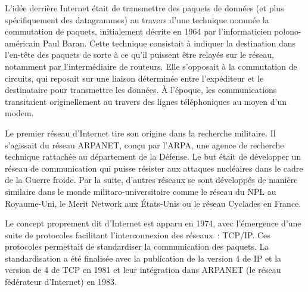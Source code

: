 
L'idée derrière Internet était de transmettre des paquets de données (et plus spécifiquement des datagrammes) au travers d'une technique nommée la commutation de paquets, initialement décrite en 1964 par l'informaticien polono-américain Paul Baran. Cette technique consistait à indiquer la destination dans l'en-tête des paquets de sorte à ce qu'il puissent être relayés sur le réseau, notamment par l'intermédiaire de routeurs. Elle s'opposait à la commutation de circuits, qui reposait sur une liaison déterminée entre l'expéditeur et le destinataire pour transmettre les données. À l'époque, les communications transitaient originellement au travers des lignes téléphoniques au moyen d'un modem.


Le premier réseau d'Internet tire son origine dans la recherche militaire. Il s'agissait du réseau ARPANET, conçu par l'ARPA, une agence de recherche technique rattachée au département de la Défense. Le but était de développer un réseau de communication qui puisse résister aux attaques nucléaires dans le cadre de la Guerre froide. Par la suite, d'autres réseaux se sont développés de manière similaire dans le monde militaro-universitaire comme le réseau du NPL au Royaume-Uni, le Merit Network aux États-Unis ou le réseau Cyclades en France.

Le concept proprement dit d'Internet est apparu en 1974, avec l'émergence d'une suite de protocoles facilitant l'interconnexion des réseaux~: TCP/IP. Ces protocoles permettait de standardiser la communication des paquets. La standardisation a été finalisée avec la publication de la version 4 de IP et la version de 4 de TCP en 1981 et leur intégration dans ARPANET (le réseau fédérateur d'Internet) en 1983.

